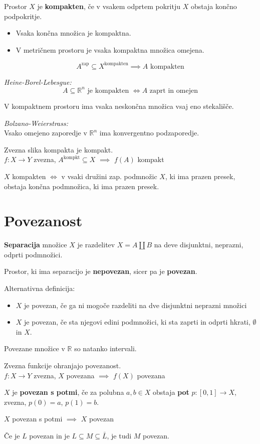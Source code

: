Prostor $X$ je \textbf{kompakten}, če v vsakem odprtem pokritju $X$ obstaja končno podpokritje.

\begin{itemize}
	\item Vsaka končna množica je kompaktna.
	\item V metričnem prostoru je vsaka kompaktna množica omejena.
\end{itemize}

\[ A^{\text{zap}} \subseteq X^{\text{kompakten}} \implies A \text{ kompakten} \]

\emph{Heine-Borel-Lebesgue:}
\[ A \subseteq \mathbb{R}^n \text{ je kompakten } \iff A \text{ zaprt in omejen} \]

V kompaktnem prostoru ima vsaka neskončna množica vsaj eno stekališče.

\emph{Bolzano-Weierstrass:}\\
Vsako omejeno zaporedje v $\mathbb{R}^n$ ima konvergentno podzaporedje.

Zvezna slika kompakta je kompakt.\\
$f: X \to Y$ zvezna, $A^\text{kompkt} \subseteq X$ $\implies$ $f(A)$ kompakt

$X$ kompakten $\iff$ v vsaki družini zap. podmnožic $X$, ki ima prazen presek, obstaja končna podmnožica, ki ima prazen presek.

\section*{Povezanost}
\textbf{Separacija} množice $X$ je razdelitev $X = A \amalg B$ na deve disjunktni, neprazni, odprti podmnožici.

Prostor, ki ima separacijo je \textbf{nepovezan}, sicer pa je \textbf{povezan}.

Alternativna definicija:
\begin{itemize}
	\item $X$ je povezan, če ga ni mogoče razdeliti na dve disjunktni neprazni množici
	\item $X$ je povezan, če sta njegovi edini podmnožici, ki sta zaprti in odprti hkrati, $\emptyset$ in $X$.
\end{itemize}

Povezane množice v $\mathbb{R}$ so natanko intervali.

Zvezna funkcije ohranjajo povezanost.\\
$f: X \to Y$ zvezna, $X$ povezana $\implies$ $f(X)$ povezana

$X$ je \textbf{povezan s potmi}, če za polubna $a,b \in X$ obstaja \textbf{pot} $p: [0,1] \to X$, zvezna, $p(0) = a$, $p(1) = b$.

$X$ povezan s potmi $\implies$ $X$ povezan

Če je $L$ povezan in je $L \subseteq M \subseteq \bar{L}$, je tudi $M$ povezan.